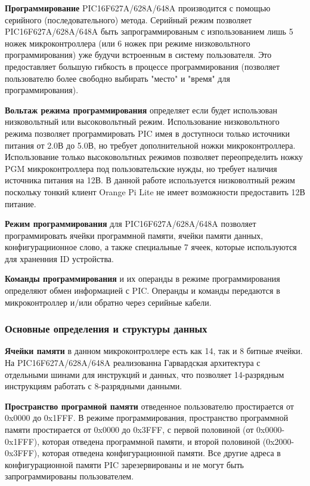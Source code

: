 \textbf{Программирование}
PIC16F627A/628A/648A производится с помощью
серийного (последовательного) метода. Серийный режим позволяет
PIC16F627A/628A/648A быть запрограммированым с изпользованием лишь 5 ножек микроконтроллера (или 6 ножек при режиме низковольтного программирования) уже будучи встроенным
в систему пользователя. Это предоставляет большую гибкость в процессе программирования 
(позволяет пользователю более свободно выбирать "место" и "время" для программирования).

\textbf{Вольтаж режима программирования}
определяет если будет использован низковольтный или высоковольтный режим. Использование низковольтного режима позволяет программировать PIC имея в доступноси только источники питания от 2.0В до 5.0В, но требует дополнительной ножки микроконтроллера. Использование только высоковольтных режимов позволяет переопределить ножку PGM микроконтроллера под пользовательские нужды, но требует наличия источника питания на 12В. В данной работе используется низковолтный режим поскольку тонкий клиент Orange Pi Lite не имеет возможности предоставить 12В питание.

\textbf{Режим программирования}
для PIC16F627A/628A/648A позволяет программировать ячейки
 программной памяти, ячейки памяти данных, конфигурациионное слово, а также специальные 7 ячеек, которые используются для храненния ID устройства.

\textbf{Команды программирования} 
и их операнды в режиме программирования определяют обмен информацией с PIC. Операнды и команды передаются в микроконтроллер и/или обратно через серийные кабели.



\subsubsection{Основные определения и структуры данных}

\textbf{Ячейки памяти}
в данном микроконтроллере есть как 14, так и 8 битные ячейки. 
На PIC16F627A/628A/648A реализованна Гарвардская
архитектура с отдельными шинами для инструкций и данных, что позволяет 
14-разрядным инструкциям работать с 8-разрядными данными.

\textbf{Пространство програмной памяти}
отведенное пользователю простирается от 0x0000 до
0x1FFF. В режиме программирования, пространство программной памяти
простирается от 0x0000 до 0x3FFF, с первой
половиной (от 0x0000-0x1FFF), которая отведена программной памяти, и
второй половиной (0x2000-0x3FFF), которая отведена конфигурационной
памяти. Все другие адреса в конфигурационной памяти PIC зарезервированы 
и не могут быть запрограммированы пользователем.

